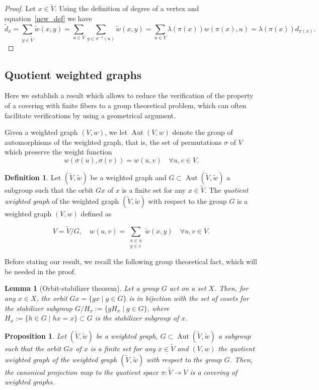 \documentclass[11pt]{amsart}
\theoremstyle{definition}
\newtheorem{definition}{Definition}
\theoremstyle{remark}
\theoremstyle{plain}
\newtheorem{proposition}{Proposition}
\newtheorem{lemma}{Lemma}
\numberwithin{equation}{section}
\numberwithin{lemma}{section}
\numberwithin{definition}{section}
\numberwithin{proposition}{section}
\numberwithin{corollary}{section}
\numberwithin{theorem}{section}
\numberwithin{remark}{section}
\begin{document}
\begin{proof}
Let $x\in\tilde{V}$. Using the definition of degree of a vertex and equation~\eqref{new_def} we have 
$$
\tilde{d}_x  =\sum_{y\in\tilde{V}}\tilde{w}(x,y) = \sum_{u\in V}\sum_{y\in\pi^{-1}(u)}\tilde{w}(x,y) = \sum_{u\in V}\lambda(\pi(x))w(\pi(x),u) = \lambda(\pi(x))d_{\pi(x)}.
$$
\end{proof}

\subsection{Quotient weighted graphs}
Here we establish a result which allows to reduce the verification of the property of a covering with finite fibers to a group theoretical problem, which can often facilitate verifications by using a geometrical argument.

Given a weighted graph $(V,w)$, we let $\operatorname{Aut}(V,w)$ denote the group of automorphisms of the weighted graph, that is, the set of permutations $\sigma$ of $V$ which preserve the weight function
$$
w(\sigma(u),\sigma(v))=w(u,v) \quad \forall u,v\in V.
$$

\begin{definition}
 Let $(\tilde{V},\tilde{w})$ be a weighted graph and $G\subset \operatorname{Aut}(\tilde{V},\tilde{w})$ a subgroup such that the orbit $Gx$ of $x$ is a finite set for any $x\in\tilde{V}$. The \textit{quotient weighted graph} of the weighted graph $(\tilde{V},\tilde{w})$ with respect to the group $G$ is a weighted graph $(V,w)$  defined as
 
\begin{equation} \label{qgraph}
 V=\tilde{V}/G, \quad w(u,v)=\sum_{\substack{x\in u\\ y\in v}}\tilde{w}(x,y) \quad \forall u,v\in V.
\end{equation}
\end{definition}
 
 Before stating our result, we recall the following group theoretical fact, which will be needed in the proof.
\begin{lemma}[Orbit-stabilizer theorem]
Let a group $G$ act on a set $X$. Then, for any $x\in X$, the orbit $Gx=\{gx\mid g\in G\}$ is in bijection with the set of cosets for the stabilizer subgroup $G/H_x:=\{gH_x\mid g\in G\}$, where $H_x:=\{h\in G\mid hx=x\}\subset G$ is the stabilizer subgroup of $x$.
\end{lemma}

\begin{proposition}
\label{Prop2}
 Let $(\tilde{V},\tilde{w})$ be a weighted graph, $G\subset \operatorname{Aut}(\tilde{V},\tilde{w})$ a subgroup such that the orbit $Gx$ of $x$ is a finite set for any $x\in\tilde{V}$ and $(V,w)$ the \textit{quotient weighted graph} of the weighted graph $(\tilde{V},\tilde{w})$ with respect to the group $G$. Then, the canonical projection map to the quotient space $\pi\colon\tilde{V}\to V$ is a covering of weighted graphs.
\end{proposition}
\end{document}
